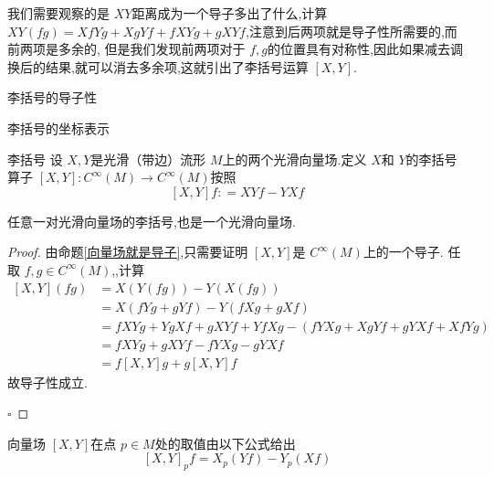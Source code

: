 \documentclass[../../几何与拓扑.tex]{subfiles}
\begin{document}
\hspace*{\fill} 

我们需要观察的是 \(  XY  \)距离成为一个导子多出了什么,计算 \(  XY\left( fg \right)=  XfYg+ XgYf+ fXYg+ gXYf   \),注意到后两项就是导子性所需要的,而前两项是多余的,
但是我们发现前两项对于 \(  f,g  \)的位置具有对称性,因此如果减去调换后的结果,就可以消去多余项,这就引出了李括号运算 \(  [X,Y]  \).    

\begin{introduction}
    \item 李括号的导子性
    \item 李括号的坐标表示
\end{introduction}

\begin{definition}{李括号}
    设 \(  X,Y  \)是光滑（带边）流形 \(  M  \)上的两个光滑向量场.定义 \(  X  \)和 \(  Y  \)的李括号  算子 \(  [X,Y]: C^{\infty}\left( M \right)\to C^{\infty}\left( M \right)    \)按照 \[
    [X,Y]f: =  XYf-YXf
    \]
\end{definition}

\begin{lemma}
    任意一对光滑向量场的李括号,也是一个光滑向量场.
\end{lemma}

\begin{proof}
    由命题\ref{向量场就是导子},只需要证明 \(  [X,Y]  \)是 \(  C^{\infty}\left( M \right)   \)上的一个导子.
    任取 \(  f,g \in C^{\infty}\left( M \right)  \),,计算 \[
    \begin{aligned}
    [X,Y]\left( fg \right)& = X\left( Y\left( fg \right)  \right)-Y\left( X\left( fg \right)  \right)\\ 
     & =      X \left( fYg+ gYf \right) -Y\left( fXg+ gXf \right) \\ 
      & =  fXYg+  YgXf+  gXYf+  YfXg-\left( fYXg+ XgYf+ gYXf+ XfYg \right)\\ 
       &  = fXYg+ gXYf-fYXg- gYXf\\ 
        & =  f[X,Y]g + g[X,Y]f
    \end{aligned}
    \]   故导子性成立.

    \hfill $\square$
\end{proof}

\begin{proposition}
    向量场 \(  [X,Y]  \)在点 \(  p \in M  \)处的取值由以下公式给出 \[
    [X,Y]_{p}f =  X_{p}\left( Yf \right)-Y_{p}\left( Xf \right)  
    \]  
\end{proposition}
\end{document}
